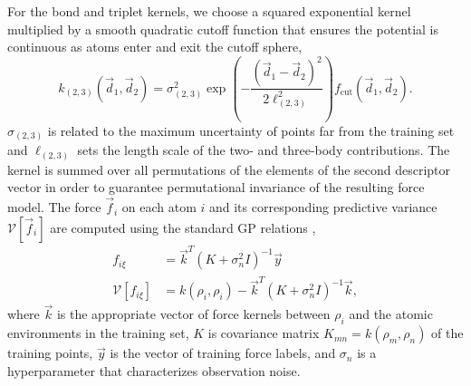 \documentclass[%
reprint,
superscriptaddress,
amsmath,amssymb,
aps,
prl,
]{revtex4-1}
\begin{document}
For the bond and triplet kernels, we choose a squared exponential kernel multiplied by a smooth quadratic cutoff function that ensures the potential is continuous as atoms enter and exit the cutoff sphere,
\begin{equation}
k_{(2, 3)}(\vec{d}_1, \vec{d}_2) = \sigma_{(2, 3)}^2 \exp\left(- \frac{(\vec{d}_1 - \vec{d}_2)^2}{2 \ell_{(2,3)}^2} \right) f_{\text{cut}}(\vec{d}_1, \vec{d}_2).
\end{equation}
$\sigma_{(2, 3)}$ is related to the maximum uncertainty of points far from the training set and $\ell_{(2 ,3)}$ sets the length scale of the two- and three-body contributions. The kernel is summed over all permutations of the elements of the second descriptor vector in order to guarantee permutational invariance of the resulting force model. The force $\vec{f}_i$ on each atom $i$ and its corresponding predictive variance $\mathcal{V}[\vec{f}_i]$ are computed using the standard GP relations \cite{rasmussen2003gaussian},
\begin{equation}
	\begin{split}
f_{i\xi} &= \vec{k}^{T} \left(K + \sigma_n^2 I \right)^{-1} \vec{y} \\
\mathcal{V}[f_{i\xi}] &= k(\rho_i, \rho_i) - \vec{k}^{T} \left(K + \sigma_n^2 I \right)^{-1} \vec{k},
	\end{split}
\end{equation}
where $\vec{k}$ is the appropriate vector of force kernels between $\rho_i$ and the atomic environments in the training set, $K$ is covariance matrix $K_{mn} = k(\rho_m, \rho_n)$ of the training points, $\vec{y}$ is the vector of training force labels, and $\sigma_n$ is a hyperparameter that characterizes observation noise.
\end{document}
